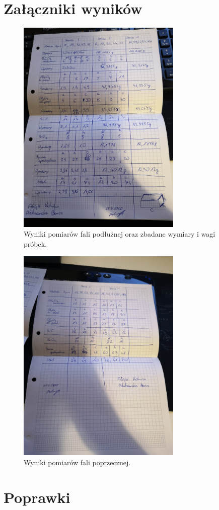 \documentclass[a4paper,12pt]{article}
\begin{document}
\section{Załączniki wyników}

\begin{figure}[H]
    \centering
    \includegraphics[width=0.7\textwidth]{img/fala_podluzna.jpg}
    \caption{Wyniki pomiarów fali podłużnej oraz zbadane wymiary i wagi próbek.}
\end{figure}

\begin{figure}[H]
    \centering
    \includegraphics[width=0.7\textwidth]{img/fala_poprzeczna.jpg}
    \caption{Wyniki pomiarów fali poprzecznej.}
\end{figure}
\newpage

\section{Poprawki}



\end{document}
